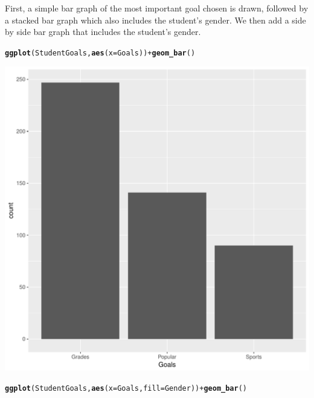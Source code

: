 \documentclass[12pt,oneside]{book}\usepackage[]{graphicx}\usepackage[]{color}
\makeatletter
\def\maxwidth{ %
  \ifdim\Gin@nat@width>\linewidth
    \linewidth
  \else
    \Gin@nat@width
  \fi
}
\newcommand{\hlopt}[1]{\textcolor[rgb]{0,0,0}{#1}}%
\newcommand{\hlstd}[1]{\textcolor[rgb]{0.345,0.345,0.345}{#1}}%
\newcommand{\hlkwc}[1]{\textcolor[rgb]{0.333,0.667,0.333}{#1}}%
\newcommand{\hlkwd}[1]{\textcolor[rgb]{0.737,0.353,0.396}{\textbf{#1}}}%
\newenvironment{kframe}{%
 \def\at@end@of@kframe{}%
 \ifinner\ifhmode%
  \def\at@end@of@kframe{\end{minipage}}%
  \begin{minipage}{\columnwidth}%
 \fi\fi%
 \def\FrameCommand##1{\hskip\@totalleftmargin \hskip-\fboxsep
 \colorbox{shadecolor}{##1}\hskip-\fboxsep
     \hskip-\linewidth \hskip-\@totalleftmargin \hskip\columnwidth}%
 \MakeFramed {\advance\hsize-\width
   \@totalleftmargin\z@ \linewidth\hsize
   \@setminipage}}%
 {\par\unskip\endMakeFramed%
 \at@end@of@kframe}
\newenvironment{knitrout}{}{} %
\makeatother
\begin{document}
First, a simple bar graph of the most important goal chosen is drawn, followed by a stacked bar graph which also includes the student's gender. We then add a side by side bar graph that includes the student's gender.
\begin{knitrout}
\color{fgcolor}\begin{kframe}
\begin{alltt}
\hlkwd{ggplot}\hlstd{(StudentGoals,} \hlkwd{aes}\hlstd{(}\hlkwc{x} \hlstd{= Goals))} \hlopt{+} \hlkwd{geom_bar}\hlstd{()}
\end{alltt}
\end{kframe}
\includegraphics[width=\maxwidth]{figure/unnamed-chunk-81-1} 
\begin{kframe}\begin{alltt}
\hlkwd{ggplot}\hlstd{(StudentGoals,} \hlkwd{aes}\hlstd{(}\hlkwc{x} \hlstd{= Goals,} \hlkwc{fill} \hlstd{= Gender))} \hlopt{+} \hlkwd{geom_bar}\hlstd{()}
\end{alltt}
\end{kframe}

\end{knitrout}
\end{document}
